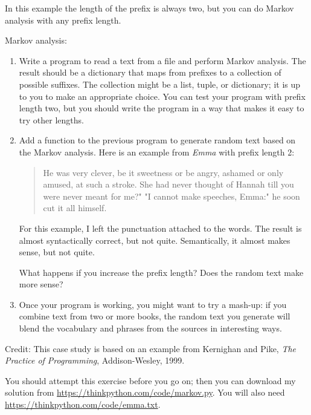 \documentclass[10pt]{book}
\begin{document}
In this example the length of the prefix is always two, but
you can do Markov analysis with any prefix length.

\begin{exercise}

Markov analysis:

\begin{enumerate}

\item Write a program to read a text from a file and perform Markov
analysis.  The result should be a dictionary that maps from
prefixes to a collection of possible suffixes.  The collection
might be a list, tuple, or dictionary; it is up to you to make
an appropriate choice.  You can test your program with prefix
length two, but you should write the program in a way that makes
it easy to try other lengths.

\item Add a function to the previous program to generate random text
based on the Markov analysis.  Here is an example from {\em Emma}
with prefix length 2:

\begin{quote}
He was very clever, be it sweetness or be angry, ashamed or only
amused, at such a stroke. She had never thought of Hannah till you
were never meant for me?" "I cannot make speeches, Emma:" he soon cut
it all himself.
\end{quote}

For this example, I left the punctuation attached to the words.
The result is almost syntactically correct, but not quite.
Semantically, it almost makes sense, but not quite.

What happens if you increase the prefix length?  Does the random
text make more sense?

\item Once your program is working, you might want to try a mash-up:
if you combine text from two or more books, the random
text you generate will blend the vocabulary and phrases from
the sources in interesting ways.

\end{enumerate}

Credit: This case study is based on an example from Kernighan and
Pike, {\em The Practice of Programming}, Addison-Wesley, 1999.

\end{exercise}

You should attempt this exercise before you go on; then you can
download my solution from \url{https://thinkpython.com/code/markov.py}.
You will also need \url{https://thinkpython.com/code/emma.txt}.
\end{document}
